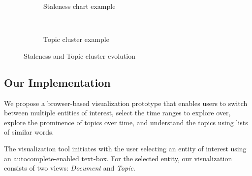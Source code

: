 \documentclass{article}
\begin{document}
\begin{figure}[tb]
\begin{subfigure}[b]{0.4\textwidth}
			\caption{Staleness chart example}
			\label{stalenessEvol}
        \end{subfigure}
        \\
        \begin{subfigure}[b]{0.25\textwidth}
			\caption{Topic cluster example}
			\label{wordcloud}
        \end{subfigure}
        \caption{Staleness and Topic cluster evolution}
\end{figure}

\subsection{Our Implementation}

We propose a browser-based visualization prototype that enables users to switch between multiple entities of interest, select the time ranges to explore over, explore the prominence of topics over time, and understand the topics using lists of similar words.


The visualization tool initiates with the user selecting an entity of interest using an autocomplete-enabled text-box.
For the selected entity, our visualization consists of two views: \emph{Document} and \emph{Topic}.
\end{document}
